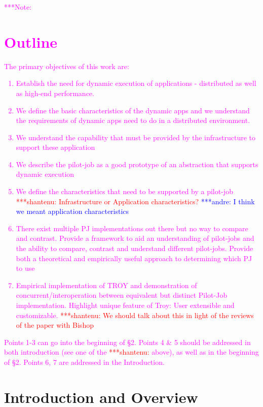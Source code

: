 \documentclass[conference,final]{IEEEtran}
\newcommand{\jhanote}[1]{ {\textcolor{red} { ***shantenu: #1 }}}
\newcommand{\alnote}[1]{ {\textcolor{blue} { ***andre: #1 }}}
\newcommand{\note}[1]{ {\textcolor{magenta} { ***Note: #1 }}}
\newcommand{\alnote}[1]{}
\newcommand{\jhanote}[1]{}
\newcommand{\note}[1]{}
\newcommand{\upp}{\vspace*{-0.5em}}
\begin{document}
\note{
\section*{Outline}
The primary objectives of this work are:
\begin{enumerate}
\item Establish the need for dynamic execution of applications -
  distributed as well as high-end performance.
\item We define the basic characteristics of the dynamic apps and we
  understand the requirements of dynamic apps need to do in a
  distributed environment.
\item We understand the capability that must be provided by the
  infrastructure to support these application
\item We describe the pilot-job as a good prototype of an abstraction
  that supports dynamic execution
\item We define the characteristics that need to be supported by a
  pilot-job \jhanote{Infrastructure or Application characteristics?}
  \alnote{I think we meant application characteristics}
\item There exist multiple PJ implementations out there but no way to
  compare and contrast. Provide a framework to aid an understanding of
  pilot-jobs and the ability to compare, contrast and understand
  different pilot-jobs.  Provide both a theoretical and empirically
  useful approach to determining which PJ to use
\item Empirical implementation of TROY and demonstration of
  concurrent/interoperation between equivalent but distinct Pilot-Job
  implementation. Highlight unique feature of Troy: User extensible
  and customizable. \jhanote{We should talk about this in light of the
    reviews of the paper with Bishop}
\end{enumerate}
Points 1-3 can go into the beginning of \S 2.  Points 4 \& 5 should be
addressed in both introduction (see one of the \jhanote{} above), as
well as in the beginning of \S 2. Points 6, 7 are addressed in the
Introduction.
}

\section{Introduction and Overview \upp\upp}

 
\end{document}
